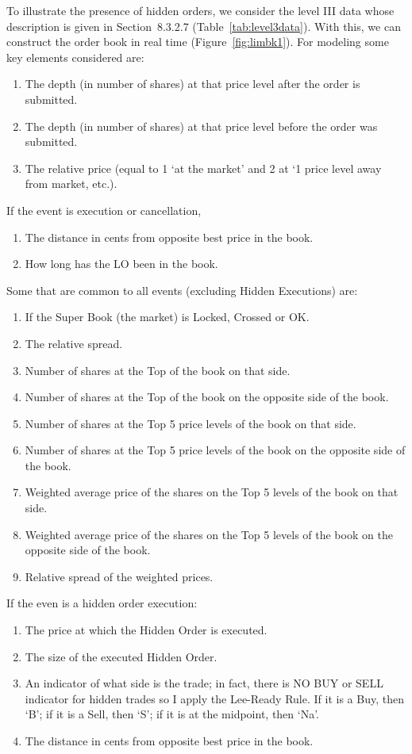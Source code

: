To illustrate the presence of hidden orders, we consider the level III data whose description is given in Section~8.3.2.7 (Table~\ref{tab:level3data}). With this, we can construct the order book in real time (Figure~\ref{fig:limbk1}). For modeling some key elements considered are:
        \begin{enumerate}[--]
        \item The depth (in number of shares) at that price level after the order is submitted.
        \item The depth (in number of shares) at that price level before the order was submitted.
        \item The relative price (equal to 1 `at the market' and 2 at `1 price level away from market, etc.). 
        \end{enumerate}
        If the event is execution or cancellation,
        \begin{enumerate}[--]
        \item The distance in cents from opposite best price in the book.
        \item How long has the LO been in the book.
        \end{enumerate}
        Some that are common to all events (excluding Hidden Executions) are:
        \begin{enumerate}[--]
        \item If the Super Book (the market) is Locked, Crossed or OK.
        \item The relative spread.
        \item Number of shares at the Top of the book on that side.
        \item Number of shares at the Top of the book on the opposite side of the book.
        \item Number of shares at the Top 5 price levels of the book on that side.
        \item Number of shares at the Top 5 price levels of the book on the opposite side of the book.
        \item Weighted average price of the shares on the Top 5 levels of the book on that side.
        \item Weighted average price of the shares on the Top 5 levels of the book on the opposite side of the book.
        \item Relative spread of the weighted prices.
        \end{enumerate}
If the even is a hidden order execution:
        \begin{enumerate}[--]
        \item The price at which the Hidden Order is executed.
        \item The size of the executed Hidden Order.
        \item An indicator of what side is the trade; in fact, there is NO BUY or SELL indicator for hidden trades so I apply the Lee-Ready Rule. If it is a Buy, then `B'; if it is a Sell, then `S'; if it is at the midpoint, then `Na'.
        \item The distance in cents from opposite best price in the book.
        \end{enumerate}


